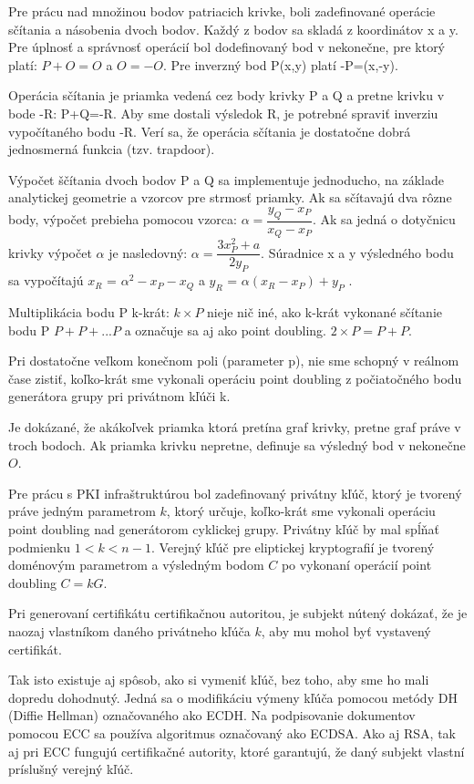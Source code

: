 \documentclass[12pt,a4paper,oneside,openright]{report}
\begin{document}
Pre prácu nad množinou bodov patriacich krivke, boli zadefinované operácie sčítania a násobenia dvoch bodov. Každý z bodov sa skladá z  koordinátov x a y. Pre úplnosť a správnosť operácií bol dodefinovaný bod v nekonečne, pre ktorý platí: $P+O=O$ a $O=-O$.
Pre inverzný bod P(x,y) platí -P=(x,-y).

Operácia sčítania je priamka vedená cez body krivky P a Q a  pretne krivku v bode -R: P+Q=-R. Aby sme dostali výsledok R, je potrebné spraviť inverziu vypočítaného bodu -R. Verí sa, že operácia sčítania je dostatočne dobrá jednosmerná funkcia (tzv. trapdoor).

Výpočet ščítania dvoch bodov P a Q sa implementuje jednoducho, na základe analytickej geometrie a vzorcov pre strmosť priamky.
Ak sa sčítavajú dva rôzne body, výpočet prebieha pomocou vzorca: $\alpha = \dfrac{ y_{Q}-x_{P}}{x_{Q}-x_{P}}$. Ak sa jedná o dotyčnicu krivky výpočet $\alpha$ je nasledovný: $\alpha = \dfrac{3x_{P}^2 + a}{2y_{P}}$. Súradnice x a y výsledného bodu sa vypočítajú
$x_{R}$ = $\alpha ^2 - x_{P} - x_{Q}$ a 
$y_{R}$ = $\alpha (x_{R} - x_{P}) + y_{P}$ \cite{ecclesson}.

Multiplikácia bodu P k-krát: $k\times P$ nieje nič iné, ako k-krát vykonané sčítanie bodu P $P+P+...P$ a označuje sa aj ako point doubling. $2\times P = P+P$\cite{ecclesson}.

Pri dostatočne veľkom konečnom poli (parameter p), nie sme schopný v reálnom čase zistiť, koľko-krát sme vykonali operáciu point doubling z počiatočného bodu generátora grupy pri privátnom kľúči k.

Je dokázané, že akákoľvek priamka ktorá pretína graf krivky, pretne graf práve v troch bodoch. Ak priamka krivku nepretne, definuje sa výsledný bod v nekonečne $O$.

Pre prácu s PKI infraštruktúrou bol zadefinovaný privátny kľúč, ktorý je tvorený práve jedným parametrom $k$, ktorý určuje, koľko-krát sme vykonali operáciu point doubling nad generátorom cyklickej grupy. Privátny kľúč by mal spĺňať podmienku $1<k<n-1$. Verejný kľúč pre eliptickej kryptografií je tvorený doménovým parametrom a výsledným bodom $C$ po vykonaní operácií point doubling $C=kG$.

Pri generovaní certifikátu certifikačnou autoritou, je subjekt nútený dokázať, že je naozaj vlastníkom daného privátneho kľúča $k$, aby mu mohol byť vystavený certifikát\cite{ecclesson}.

Tak isto existuje aj spôsob, ako si vymeniť kľúč, bez toho, aby sme ho mali dopredu dohodnutý. Jedná sa o modifikáciu výmeny kľúča pomocou metódy DH (Diffie Hellman) označovaného ako ECDH. Na podpisovanie dokumentov pomocou ECC sa používa algoritmus označovaný ako ECDSA. Ako aj RSA, tak aj pri ECC fungujú certifikačné autority, ktoré garantujú, že daný subjekt vlastní príslušný verejný kľúč\cite{ecclesson}.
\end{document}
